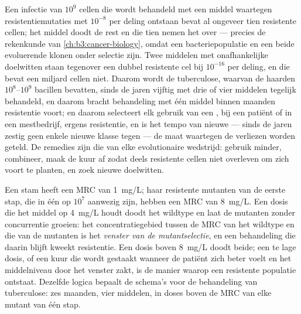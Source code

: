 \begin{proposition}\label{prop:b3:bacteriology:selection}
Een infectie van $10^{9}$ cellen die wordt behandeld met een middel
waartegen resistentiemutaties met $10^{-8}$ per deling ontstaan bevat
al ongeveer tien resistente cellen; het middel doodt de rest en die
tien nemen het over --- precies de rekenkunde van
\cref{ch:b3:cancer-biology}, omdat een bacteriepopulatie en een 
beide evoluerende klonen onder selectie zijn. Twee middelen met
onafhankelijke doelwitten staan tegenover een dubbel resistente cel bij
$10^{-16}$ per deling, en die bevat een miljard cellen niet. Daarom
wordt de tuberculose, waarvan de haarden $10^{8}$--$10^{9}$ bacillen
bevatten, sinds de jaren vijftig met drie of vier middelen tegelijk
behandeld, en daarom bracht behandeling met één middel binnen maanden
resistentie voort; en daarom selecteert elk gebruik van een
, bij een patiënt of in een mestbedrijf, ergens
resistentie, en is het tempo van nieuwe  --- sinds de jaren
zestig geen enkele nieuwe klasse tegen  --- de maat
waartegen de verliezen worden geteld. De remedies zijn die van elke
evolutionaire wedstrijd: gebruik minder, combineer, maak de kuur af
zodat deels resistente cellen niet overleven om zich voort te planten,
en zoek nieuwe doelwitten.
\end{proposition}

\begin{example}\label{ex:b3:bacteriology:window}
Een stam heeft een MRC van \qty{1}{mg/L}; haar resistente mutanten van
de eerste stap, die in één op $10^{7}$ aanwezig zijn, hebben een MRC van
\qty{8}{mg/L}. Een dosis die het middel op \qty{4}{mg/L} houdt doodt het
wildtype en laat de mutanten zonder concurrentie groeien: het
concentratiegebied tussen de MRC van het wildtype en die van de
mutanten is het \emph{venster van de mutantselectie}, en een
behandeling die daarin blijft kweekt resistentie. Een dosis boven
\qty{8}{mg/L} doodt beide; een te lage dosis, of een kuur die wordt
gestaakt wanneer de patiënt zich beter voelt en het middelniveau door
het venster zakt, is de manier waarop een resistente populatie ontstaat.
Dezelfde logica bepaalt de schema's voor de behandeling van
tuberculose: zes maanden, vier middelen, in doses boven de MRC van elke
mutant van één stap.
\end{example}

